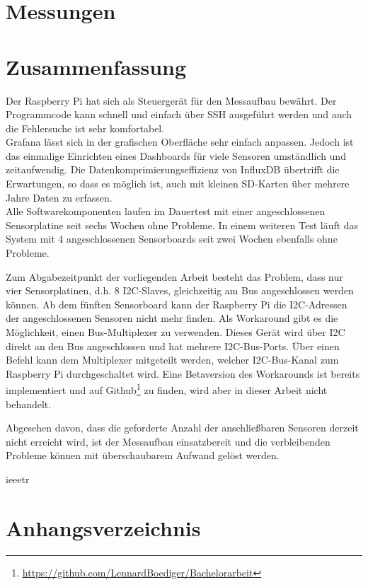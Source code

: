 \documentclass[a4paper,oneside,12pt,titlepage]{scrartcl}   %
\begin{document}
\section{Messungen}

\newpage
\section{Zusammenfassung}
Der Raspberry Pi hat sich als Steuergerät für den Messaufbau bewährt.
Der Programmcode kann schnell und einfach über SSH ausgeführt werden und auch die Fehlersuche ist sehr komfortabel.\\
Grafana lässt sich in der grafischen Oberfläche sehr einfach anpassen. Jedoch ist das einmalige Einrichten eines Dashboards für viele Sensoren umständlich und zeitaufwendig.
Die Datenkomprimierungseffizienz von InfluxDB übertrifft die Erwartungen, so dass es möglich ist, auch mit kleinen SD-Karten über mehrere Jahre Daten zu erfassen.\\
Alle Softwarekomponenten laufen im Dauertest mit einer angeschlossenen Sensorplatine seit sechs Wochen ohne Probleme.
In einem weiteren Test läuft das System mit 4 angeschlossenen Sensorboards seit zwei Wochen ebenfalls ohne Probleme.\smallskip

\noindent Zum Abgabezeitpunkt der vorliegenden Arbeit besteht das Problem, dass nur vier Sensorplatinen, d.h. 8 I2C-Slaves, gleichzeitig am Bus angeschlossen werden können.
Ab dem fünften Sensorboard kann der Raspberry Pi die I2C-Adressen der angeschlossenen Sensoren nicht mehr finden.
Als Workaround gibt es die Möglichkeit, einen Bus-Multiplexer zu verwenden.
Dieses Gerät wird über I2C direkt an den Bus angeschlossen und hat mehrere I2C-Bus-Ports. Über einen Befehl kann dem Multiplexer mitgeteilt werden, welcher I2C-Bus-Kanal zum Raspberry Pi durchgeschaltet wird.
Eine Betaversion des Workarounds ist bereits implementiert und auf Github\footnote{\url{https://github.com/LennardBoediger/Bachelorarbeit}} zu finden, wird aber in dieser Arbeit nicht behandelt.
\smallskip

\noindent Abgesehen davon, dass die geforderte Anzahl der anschließbaren Sensoren derzeit nicht erreicht wird, ist der Messaufbau einsatzbereit und die verbleibenden Probleme können mit überschaubarem Aufwand gelöst werden.
\newpage

 {ieeetr}
\newpage
\section*{Anhangsverzeichnis}
\end{document}
